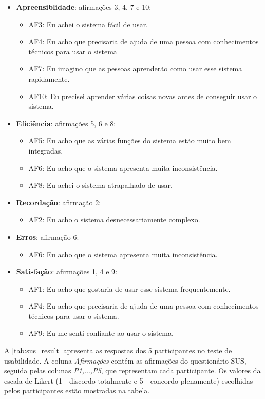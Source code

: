 \begin{itemize}
  \item \textbf{Apreensiblidade}: afirmações 3, 4, 7 e 10:
  \begin{itemize}
    \item AF3: Eu achei o sistema fácil de usar.
    \item AF4: Eu acho que precisaria de ajuda de uma pessoa com conhecimentos
    técnicos para usar o sistema
    \item AF7: Eu imagino que as pessoas aprenderão como usar esse sistema
    rapidamente.
    \item AF10: Eu precisei aprender várias coisas novas antes de conseguir
    usar o sistema.
  \end{itemize}
  \item \textbf{Eficiência}: afirmações 5, 6 e 8:
  \begin{itemize}
    \item AF5: Eu acho que as várias funções do sistema estão muito bem
    integradas.
    \item AF6: Eu acho que o sistema apresenta muita inconsistência.
    \item AF8: Eu achei o sistema atrapalhado de usar.
  \end{itemize}
  \item \textbf{Recordação}: afirmação 2:
  \begin{itemize}
    \item AF2: Eu acho o sistema desnecessariamente complexo.
  \end{itemize}
  \item \textbf{Erros}: afirmação 6:
  \begin{itemize}
    \item AF6: Eu acho que o sistema apresenta muita inconsistência.
  \end{itemize}
  \item \textbf{Satisfação}: afirmações 1, 4 e 9:
  \begin{itemize}
    \item AF1: Eu acho que gostaria de usar esse sistema frequentemente.
    \item AF4: Eu acho que precisaria de ajuda de uma pessoa com conhecimentos
    técnicos para usar o sistema.
    \item AF9: Eu me senti confiante ao usar o sistema.
  \end{itemize}
\end{itemize}

A \autoref{tab:sus_result} apresenta as respostas dos 5 participantes no teste de usabilidade.
A coluna \textit{Afirmações} contém as afirmações do questionário SUS, seguida pelas colunas
\textit{P1,$\ldots$,P5}, que representam cada participante. Os valores da escala de Likert
(1 - discordo totalmente e 5 - concordo plenamente) escolhidas pelos participantes estão mostradas
na tabela.

